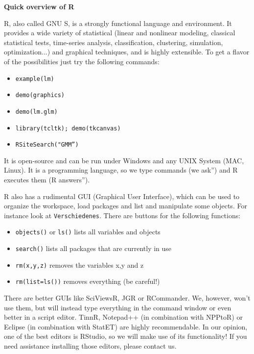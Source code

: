 \begin{Solution}{1}
\textbf{Quick overview of R}

R, also called GNU S, is a strongly functional language and environment. It provides a wide variety of statistical (linear and nonlinear modeling, classical statistical tests, time-series analysis, classification, clustering, simulation, optimization...) and graphical techniques, and is highly extensible. To get a flavor of the possibilities just try the
following commands:

\begin{itemize}
\item \texttt{example(lm)}
\item \texttt{demo(graphics)}
\item \texttt{demo(lm.glm)}
\item \texttt{library(tcltk); demo(tkcanvas)}
\item \texttt{RSiteSearch("GMM\textquotedblright)}
\end{itemize}

It is open-source and can be run under Windows and any UNIX System (MAC, Linux). It is a programming language, so we type commands (\quotedblbase we ask\textquotedblright ) and R executes them (\quotedblbase R answers\textquotedblright ).

R also has a rudimental GUI (Graphical User Interface), which can be used to organize the workspace, load packages and list and manipulate some objects. For instance look at \texttt{Verschiedenes}. There are buttons for the following functions:
\begin{itemize}
  \item \texttt{objects()} or \texttt{ls()} lists all variables and
      objects
  \item \texttt{search()} lists all packages that are currently in use
  \item \texttt{rm(x,y,z)} removes the variables x,y and z
  \item \texttt{rm(list=ls())} removes everything (be careful!)
\end{itemize}

There are better GUIs like SciViewsR, JGR or RCommander. We, however, won't use them, but will instead type everything in the command window or even better in a script editor. TinnR, Notepad++ (in combination with NPPtoR) or Eclipse (in combination with StatET) are highly recommendable. In our opinion, one of the best editors is RStudio, so we will make use of its functionality! If you need assistance installing those editors, please contact us.


\end{Solution}
